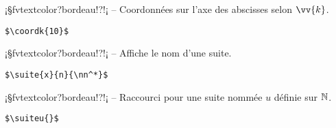 \documentclass[11pt,a4paper,rgb]{report}
\begin{document}
\setlength{\leftskip}{0pt}
\setlength{\textwidth}{18cm}%


\vspace*{.75cm}

\inCodeStub¡§fvtextcolor?bordeau!?!¡ -- Coordonnées sur l'axe des abscisses selon $\vv{k}$.

\setlength{\leftskip}{.75cm}%
\setlength{\textwidth}{17.25cm}%

\colorbox{blue!15}{}
\hfill
\begin{minipage}{.65\textwidth}
	\begin{lstlisting}[linewidth=\textwidth, language={[LaTeX]TeX}]
	$\coordk{10}$
	\end{lstlisting}
\end{minipage}

\setlength{\leftskip}{0pt}
\setlength{\textwidth}{18cm}%


\vspace*{.75cm}

\inCodeStub¡§fvtextcolor?bordeau!?!¡ -- Affiche le nom d'une suite.

\setlength{\leftskip}{.75cm}%
\setlength{\textwidth}{17.25cm}%

\colorbox{blue!15}{}
\hfill
\begin{minipage}{.65\textwidth}
	\begin{lstlisting}[linewidth=\textwidth, language={[LaTeX]TeX}]
	$\suite{x}{n}{\nn^*}$
	\end{lstlisting}
\end{minipage}

\setlength{\leftskip}{0pt}
\setlength{\textwidth}{18cm}%


\vspace*{.75cm}

\inCodeStub¡§fvtextcolor?bordeau!?\suiteu{}!¡ -- Raccourci pour une suite nommée $u$ définie sur $\mathbb{N}$.

\setlength{\leftskip}{.75cm}%
\setlength{\textwidth}{17.25cm}%

\colorbox{blue!15}{}
\hfill
\begin{minipage}{.65\textwidth}
	\begin{lstlisting}[linewidth=\textwidth, language={[LaTeX]TeX}]
	$\suiteu{}$
	\end{lstlisting}
\end{minipage}
\end{document}
